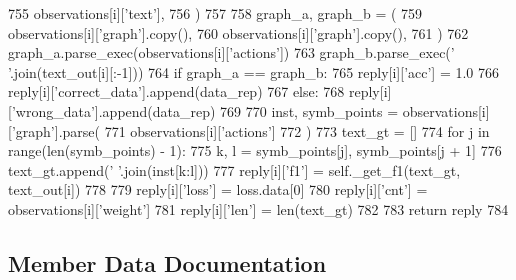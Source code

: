 \begin{DoxyCode}
755                     observations[i][\textcolor{stringliteral}{'text'}],
756                 )
757 
758                 graph\_a, graph\_b = (
759                     observations[i][\textcolor{stringliteral}{'graph'}].copy(),
760                     observations[i][\textcolor{stringliteral}{'graph'}].copy(),
761                 )
762                 graph\_a.parse\_exec(observations[i][\textcolor{stringliteral}{'actions'}])
763                 graph\_b.parse\_exec(\textcolor{stringliteral}{' '}.join(text\_out[i][:-1]))
764                 \textcolor{keywordflow}{if} graph\_a == graph\_b:
765                     reply[i][\textcolor{stringliteral}{'acc'}] = 1.0
766                     reply[i][\textcolor{stringliteral}{'correct\_data'}].append(data\_rep)
767                 \textcolor{keywordflow}{else}:
768                     reply[i][\textcolor{stringliteral}{'wrong\_data'}].append(data\_rep)
769 
770                 inst, symb\_points = observations[i][\textcolor{stringliteral}{'graph'}].parse(
771                     observations[i][\textcolor{stringliteral}{'actions'}]
772                 )
773                 text\_gt = []
774                 \textcolor{keywordflow}{for} j \textcolor{keywordflow}{in} range(len(symb\_points) - 1):
775                     k, l = symb\_points[j], symb\_points[j + 1]
776                     text\_gt.append(\textcolor{stringliteral}{' '}.join(inst[k:l]))
777                 reply[i][\textcolor{stringliteral}{'f1'}] = self.\_get\_f1(text\_gt, text\_out[i])
778 
779                 reply[i][\textcolor{stringliteral}{'loss'}] = loss.data[0]
780                 reply[i][\textcolor{stringliteral}{'cnt'}] = observations[i][\textcolor{stringliteral}{'weight'}]
781                 reply[i][\textcolor{stringliteral}{'len'}] = len(text\_gt)
782 
783             \textcolor{keywordflow}{return} reply
784 \end{DoxyCode}


\subsection{Member Data Documentation}
\mbox{\label{classprojects_1_1mastering__the__dungeon_1_1agents_1_1graph__world2_1_1agents_1_1Seq2SeqModelAgent_a97c080f3159cacb53bf3bd35109029d6}} 
